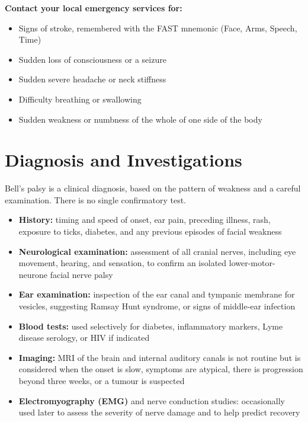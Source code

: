 \textbf{Contact your local emergency services for:}
\begin{itemize}
    \item Signs of stroke, remembered with the FAST mnemonic (Face, Arms, Speech, Time)
    \item Sudden loss of consciousness or a seizure
    \item Sudden severe headache or neck stiffness
    \item Difficulty breathing or swallowing
    \item Sudden weakness or numbness of the whole of one side of the body
\end{itemize}

\section*{Diagnosis and Investigations}
Bell's palsy is a clinical diagnosis, based on the pattern of weakness and a careful examination. There is no single confirmatory test.

\begin{itemize}
    \item \textbf{History:} timing and speed of onset, ear pain, preceding illness, rash, exposure to ticks, diabetes, and any previous episodes of facial weakness
    \item \textbf{Neurological examination:} assessment of all cranial nerves, including eye movement, hearing, and sensation, to confirm an isolated lower-motor-neurone facial nerve palsy
    \item \textbf{Ear examination:} inspection of the ear canal and tympanic membrane for vesicles, suggesting Ramsay Hunt syndrome, or signs of middle-ear infection
    \item \textbf{Blood tests:} used selectively for diabetes, inflammatory markers, Lyme disease serology, or HIV if indicated
    \item \textbf{Imaging:} MRI of the brain and internal auditory canals is not routine but is considered when the onset is slow, symptoms are atypical, there is progression beyond three weeks, or a tumour is suspected
    \item \textbf{Electromyography (EMG)} and nerve conduction studies: occasionally used later to assess the severity of nerve damage and to help predict recovery
\end{itemize}

